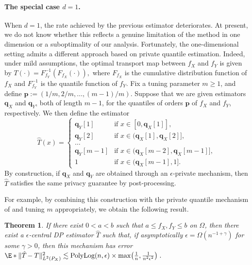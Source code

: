 \documentclass{article}
\newcommand{\1}{\mathds{1}}
\DeclarePairedDelimiter{\paren}{\lparen}{\rparen}
\theoremstyle{plain}
\newtheorem{theorem}{Theorem}[section]
\theoremstyle{definition}
\theoremstyle{remark}
\begin{document}
\paragraph{The special case $d=1$.}

When $d=1$, the rate achieved by the previous estimator deteriorates. At present, we do not know whether this reflects a genuine limitation of the method in one dimension or a suboptimality of our analysis.
Fortunately, the one-dimensional setting admits a different approach based on private quantile estimation. Indeed, under mild assumptions, the optimal transport map between $f_X$ and $f_Y$ is given by
$
T(\cdot) = F_{f_Y}^{-1}(F_{f_X}(\cdot)),
$
where $F_{f_X}$ is the cumulative distribution function of $f_X$ and $F_{f_Y}^{-1}$ is the quantile function of $f_Y$.
Fix a tuning parameter $m \geq 1$, and define
$
\mathbf{p} := (1/m, 2/m, \dots, (m-1)/m).
$
Suppose that we are given estimators $\mathbf{q}_X$ and $\mathbf{q}_Y$, both of length $m-1$, for the quantiles of orders $\mathbf{p}$ of $f_X$ and $f_Y$, respectively. We then define the estimator
\begin{equation}
    \hat{T}(x) =
    \begin{cases}
        \mathbf{q}_Y[1] & \text{if } x \in [0, \mathbf{q}_X[1]], \\
        \mathbf{q}_Y[2] & \text{if } x \in (\mathbf{q}_X[1], \mathbf{q}_X[2]], \\
        \dots \\
        \mathbf{q}_Y[m-1] & \text{if } x \in (\mathbf{q}_X[m-2], \mathbf{q}_X[m-1]], \\
        1 & \text{if } x \in (\mathbf{q}_X[m-1], 1].
    \end{cases}
\end{equation}
By construction, if $\mathbf{q}_X$ and $\mathbf{q}_Y$ are obtained through an $\epsilon$-private mechanism, then $\hat{T}$ satisfies the same privacy guarantee by post-processing.

For example, by combining this construction with the private quantile mechanism of \cite{kaplan2022differentially} and tuning $m$ appropriately, we obtain the following result.

\begin{theorem}
    \label{th:one_d_rate} 
    If there exist $0 < a < b$ such that $a \leq f_X, f_Y \leq b$ on $\Omega$, then there exist a $\epsilon$-central DP estimator $\hat{T}$ such that, if asymptotically $\epsilon = \Omega(n^{-1+\gamma})$ for some $\gamma > 0$, then this mechanism has error
    $
    \E*{\| \hat{T}_{} - T \|^2_{L^2({P_X})}}
    \lesssim \textrm{PolyLog}(n, \epsilon) \times \max\paren*{\frac{1}{n}, \frac{1}{n^2 \epsilon^2}} \;.
$
\end{theorem}
\end{document}
